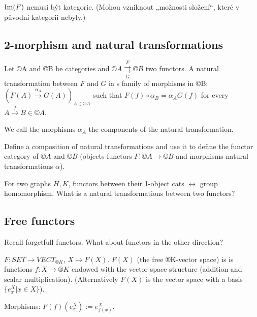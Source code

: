 \documentclass[12pt]{article}					%
\begin{document}
\begin{upozorneni}
	$\operatorname{Im}(F)$ nemusí být kategorie. (Mohou vzniknout „možnosti složení“, které v původní kategorii nebyly.)
\end{upozorneni}

\subsection{2-morphism and natural transformations}
\begin{definice}
	Let ©A and ©B be categories and $©A \overset{F}{\underset{G}\rightrightarrows} ©B$ two functors. A natural transformation between $F$ and $G$ ia s family of morphisms in ©B: $(F(A) \overset{α_A}\rightarrow G(A))_{A \in ©A}$ such that $F(f)∘α_B = α_A G(f)$ for every $A \overset{f}\rightarrow B \in ©A$.

	We call the morphisms $α_A$ the components of the natural transformation.
\end{definice}

\begin{priklad}
	Define a composition of natural transformations and use it to define the functor category of $©A$ and $©B$ (objects functors $F: ©A \rightarrow ©B$ and morphisms natural transformations $α$).
\end{priklad}

\begin{priklad}
	For two graphs $H, K$, functors between their 1-object cats $\leftrightarrow$ group homomorphism. What is a natural transformations between two functors?
\end{priklad}

\subsection{Free functors}
\begin{poznamka}
	Recall forgetfull functors. What about functors in the other direction?
\end{poznamka}

\begin{priklady}
	$F: SET \rightarrow VECT_{®K}$, $X \mapsto F(X)$. $F(X)$ (the free ®K-vector space) is is functions $f: X \rightarrow ®K$ endowed with the vector space structure (addition and scalar multiplication). (Alternatively $F(X)$ is the vector space with a basis $\{e_x^X | x \in X\}$).

	Morphisms: $F(f)(e_x^X) := e_{f(x)}^X$.
\end{priklady}
\end{document}
